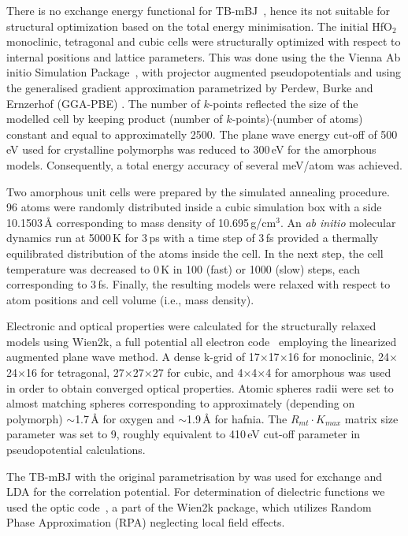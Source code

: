 \documentclass[10pt,a4paper,twocolumn]{article}
\begin{document}
There is no exchange energy functional for TB-mBJ~\cite{Tran2009}, hence its not suitable for structural optimization based on the total energy minimisation.
The initial HfO$_2$ monoclinic, tetragonal and cubic cells were structurally optimized with respect to internal positions and lattice parameters.
This was done using the the Vienna Ab initio Simulation Package~\cite{Kresse1996}, with projector augmented pseudopotentials \cite{Kresse1999} and using the generalised gradient approximation parametrized by Perdew, Burke and Ernzerhof (GGA-PBE) \cite{Perdew1996}.
The number of $k$-points reflected the size of the modelled cell by keeping product (number of $k$-points)$\cdot$(number of atoms) constant and equal to approximatelly 2500.
The plane wave energy cut-off of 500\,eV used for crystalline polymorphs was reduced to 300\,eV for the amorphous models.
Consequently, a total energy accuracy of several meV/atom was achieved.

Two amorphous unit cells were prepared by the simulated annealing procedure.
96 atoms were randomly distributed inside a cubic simulation box with a side 10.1503\,\AA{} corresponding to mass density of 10.695\,g/cm$^3$.
An \textit{ab initio} molecular dynamics run at 5000\,K for 3\,ps with a time step of 3\,fs provided a thermally equilibrated distribution of the atoms inside the cell.
In the next step, the cell temperature was decreased to 0\,K in 100 (fast) or 1000 (slow) steps, each corresponding to 3\,fs.
Finally, the resulting models were relaxed with respect to atom positions and cell volume (i.e., mass density).

Electronic and optical properties were calculated for the structurally relaxed models using Wien2k, a full potential all electron code~\cite{Blaha2001} employing the linearized augmented plane wave method.
A dense k-grid of 17$\times$17$\times$16 for monoclinic, 24$\times$24$\times$16 for tetragonal, 27$\times$27$\times$27 for cubic, and 4$\times$4$\times$4 for amorphous was used in order to obtain converged optical properties.
Atomic spheres radii were set to almost matching spheres corresponding to approximately (depending on polymorph) $\sim$1.7\,\AA{} for oxygen and $\sim$1.9\,\AA{} for hafnia.
The $R_{mt} \cdot K_{max}$ matrix size parameter was set to 9, roughly equivalent to 410\,eV cut-off parameter in pseudopotential calculations.

The TB-mBJ with the original parametrisation by \citet{Tran2009} was used for exchange and LDA for the correlation potential. For determination of dielectric functions we used the optic code~\cite{AmbroschDraxl2006}, a part of the Wien2k package, which utilizes Random Phase Approximation (RPA) neglecting local field effects.
\end{document}
